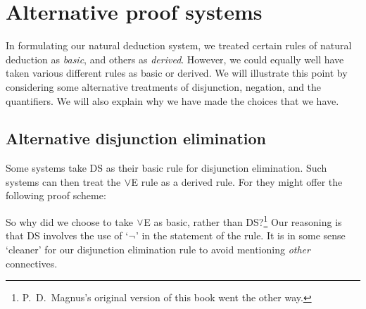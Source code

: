 
\chapter{Alternative proof systems}
In formulating our natural deduction system, we treated certain rules of natural deduction as \emph{basic}, and others as \emph{derived}. However, we could equally well have taken various different rules as basic or derived. We will illustrate this point by considering some alternative treatments of disjunction, negation, and the quantifiers. We will also explain why we have made the choices that we have.


\section{Alternative disjunction elimination}
Some systems take DS as their basic rule for disjunction elimination. Such systems can then treat the $\vee$E rule as a derived rule. For they might offer the following proof scheme: 
\begin{fitchproof}
  \open
     \AS
  \close
  \open
     \AS
  \close
  \open
     \AS
    \open
       \AS
    \close
  \close
\end{fitchproof}
So why did we choose to take $\vee$E as basic, rather than DS?\footnote{P.~D.\ Magnus's original version of this book went the other way.} Our reasoning is that DS involves the use of `$\neg$' in the statement of the rule. It is in some sense `cleaner' for our disjunction elimination rule to avoid mentioning \emph{other} connectives.


